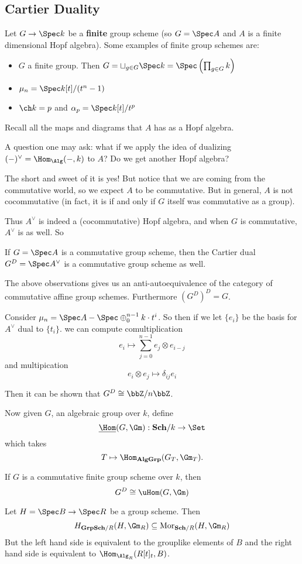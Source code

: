\documentclass[12pt]{article}
\begin{document}
\subsection{Cartier Duality}
Let $G\to\Spec k$ be a \textbf{finite} group scheme (so $G=\Spec A$ and $A$ is a finite dimensional Hopf algebra).
Some examples of finite group schemes are:
\begin{itemize}
	\item $G$ a finite group. Then $G=\sqcup_{g\in G}\Spec k=\Spec\left(\prod_{g\in G}k\right)$
	\item $\mu_n=\Spec k[t]/(t^n-1)$
	\item $\ch k=p$ and $\alpha_p=\Spec k[t]/t^p$
\end{itemize}
\begin{rmk}
	Recall all the maps and diagrams that $A$ has as a Hopf algebra.
\end{rmk}
A question one may ask: what if we apply the idea of dualizing $(-)^\vee=\Hom_\Alg(-,k)$ to $A$?
Do we get another Hopf algebra?

The short and sweet of it is yes! But notice that we are coming from the commutative world, so we expect 
$A$ to be commutative. But in general, $A$ is not cocommutative (in fact, it is if and only if $G$ itself was commutative as a group).

Thus $A^\vee$ is indeed a (cocommutative) Hopf algebra, and when $G$ is commutative, $A^\vee$ is as well. So
\begin{prop}
	If $G=\Spec A$ is a commutative group scheme, then the Cartier dual $G^D=\Spec A^\vee$ is a commutative group scheme as well.
\end{prop}
\begin{rmk}
	The above observations gives us an anti-autoequivalence of the category of commutative affine group schemes. Furthermore $(G^D)^D=G$.
\end{rmk}
\begin{ex}
	Consider $\mu_n=\Spec A-\Spec \oplus_0^{n-1}k\cdot t^i$. So then if we let $\{e_i\}$ be the basis for $A^\vee$ dual 
	to $\{t_i\}$. we can compute comultiplication 
	\[e_i\mapsto \sum_{j=0}^{n-1}e_j\otimes e_{i-j}\]
	and multipication
	\[e_i\otimes e_j\mapsto \delta_{ij}e_i\]

	Then it can be shown that $G^D\cong\bbZ/n\bbZ$.
\end{ex}

Now given $G$, an algebraic group over $k$, define 
\[\underline\Hom(G,\Gm):\mathbf{Sch}/k\to\Set\]
which takes 
\[T\mapsto \Hom_{\mathbf{AlgGrp}}(G_T,{\Gm}_T).\]
\begin{thm}\label{thm:cartier}
	If $G$ is a commutative finite group scheme over $k$, then 
	\[G^D\cong\uHom(G,\Gm)\]
\end{thm}
Let $H=\Spec B\to \Spec R$ be a group scheme. Then 
\[H_{\mathbf{GrpSch}/R}(H,{\Gm}_R)\subseteq\operatorname{Mor}_{\mathbf{Sch}/R}(H,{\Gm}_R)\]
But the left hand side is equivalent to the grouplike elements of $B$ and the right hand side is equivalent
to $\Hom_{\Alg_R}(R[t]_t,B)$.
\end{document}
